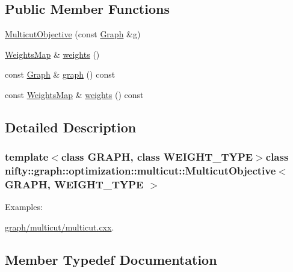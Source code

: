 \subsection*{Public Member Functions}
\begin{DoxyCompactItemize}
\item 
\hyperlink{classnifty_1_1graph_1_1optimization_1_1multicut_1_1MulticutObjective_a66c7f4d29fff0ae487b411a55b508086}{Multicut\+Objective} (const \hyperlink{classnifty_1_1graph_1_1optimization_1_1multicut_1_1MulticutObjective_a1c21fc7303fc25b19dbdf833215a9356}{Graph} \&g)
\item 
\hyperlink{classnifty_1_1graph_1_1optimization_1_1multicut_1_1MulticutObjective_a3aa13d9db4ea3f97c54f87da9e669d1b}{Weights\+Map} \& \hyperlink{classnifty_1_1graph_1_1optimization_1_1multicut_1_1MulticutObjective_a3c498081c93d87efacb892c3350ebf17}{weights} ()
\item 
const \hyperlink{classnifty_1_1graph_1_1optimization_1_1multicut_1_1MulticutObjective_a1c21fc7303fc25b19dbdf833215a9356}{Graph} \& \hyperlink{classnifty_1_1graph_1_1optimization_1_1multicut_1_1MulticutObjective_abcced067c4a726ce66ba9c335c2d972d}{graph} () const 
\item 
const \hyperlink{classnifty_1_1graph_1_1optimization_1_1multicut_1_1MulticutObjective_a3aa13d9db4ea3f97c54f87da9e669d1b}{Weights\+Map} \& \hyperlink{classnifty_1_1graph_1_1optimization_1_1multicut_1_1MulticutObjective_a51bc6fb4a277fe69d58b21e893ece268}{weights} () const 
\end{DoxyCompactItemize}


\subsection{Detailed Description}
\subsubsection*{template$<$class G\+R\+A\+P\+H, class W\+E\+I\+G\+H\+T\+\_\+\+T\+Y\+P\+E$>$class nifty\+::graph\+::optimization\+::multicut\+::\+Multicut\+Objective$<$ G\+R\+A\+P\+H, W\+E\+I\+G\+H\+T\+\_\+\+T\+Y\+P\+E $>$}

\begin{Desc}
\item[Examples\+: ]\par
\hyperlink{graph_2multicut_2multicut_8cxx-example}{graph/multicut/multicut.\+cxx}.\end{Desc}


\subsection{Member Typedef Documentation}
\hypertarget{classnifty_1_1graph_1_1optimization_1_1multicut_1_1MulticutObjective_a1c21fc7303fc25b19dbdf833215a9356}{}
